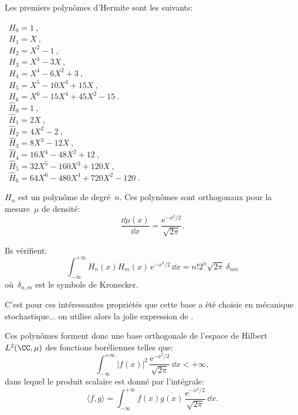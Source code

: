 \medskip
{}
Les premiers polynômes d'Hermite sont les suivants:
\begin{multicols}{2}
\noindent%
 ~$H_0=1~$,\\
 ~$H_1=X~$,\\
 ~$H_2=X^2-1~$,\\
 ~$H_3=X^3-3X~$,\\
 ~$H_4=X^4-6X^2+3~$,\\
 ~$H_5=X^5-10X^3+15X~$,\\
 ~$H_6=X^6-15X^4+45X^2-15~$.\\

\noindent%
 ~$\widehat{H}_0=1~$,\\
 ~$\widehat{H}_1=2X~$,\\
 ~$\widehat{H}_2=4X^2-2~$,\\
 ~$\widehat{H}_3=8X^3-12X~$,\\
 ~$\widehat{H}_4=16X^4-48X^2+12~$,\\
 ~$\widehat{H}_5=32X^5-160X^3+120X~$,\\
 ~$\widehat{H}_6=64X^6-480X^4+720X^2-120~$.
\end{multicols}

\medskip
$H_n$ est un polynôme de degré~$n$. 
Ces polynômes sont orthogonaux pour la mesure~$\mu$ de densité:
\begin{equation}
  \frac{\dd\mu(x)}{\dd x} = \frac{\mathrm{e}^{-x^2/2}}{\sqrt{2\pi}}.
\end{equation}

Ils vérifient:
\begin{equation}
  \int_{-\infty}^{+\infty} H_n(x)H_m(x)\,\mathrm{e}^{-x^2/2}\,\dd x=n!2^n\sqrt{2\pi}~\delta_{nm}
\end{equation}
où~$\delta_{n,m}$ est le symbole de Kronecker.

C'est pour ces intéressantes propriétés que cette base a été choisie en mécanique stochastique... 
on utilise alors la jolie expression de .

\medskip
Ces polynômes forment donc une base orthogonale de l'espace de Hilbert 
$L^2(\CC,\mu)$ des fonctions boréliennes telles que:
\begin{equation}
  \int_{-\infty}^{+\infty}|f(x)|^2\,\frac{\mathrm{e}^{-x^2/2}}{\sqrt{2\pi}}\,\dd x< +\infty,
\end{equation}
dans lequel le produit scalaire est donné par l'intégrale:
\begin{equation}
  \langle f,g\rangle=\int_{-\infty}^{+\infty} f(x)\overline{g(x)}\,\frac{\mathrm{e}^{-x^2/2}}{\sqrt{2\pi}}\,\dd x.
\end{equation}

